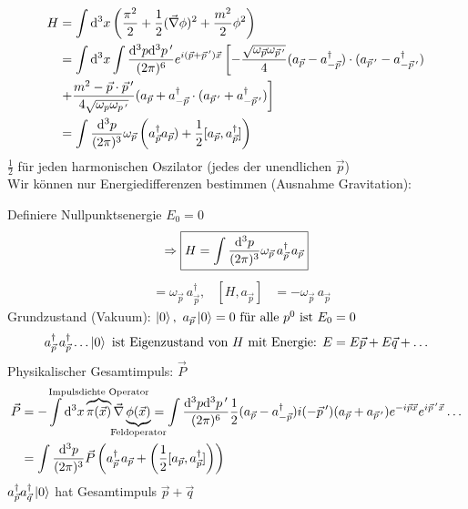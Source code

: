 	\begin{align*}
		H &= \int \mathrm{d}^3 x 
		\left(
			\frac{\pi^2}{2} + \frac{1}{2} (\vec{\nabla} \phi)^2 + \frac{m^2}{2} \phi^2
		\right) \\
		&= \int \mathrm{d}^3 x \int \frac{\mathrm{d}^3 p \mathrm{d}^3 p\,'}{(2\pi)^6} e^{i (\vec{p} + \vec{p}\,')\vec{x}} 
		\left[
			- \frac{\sqrt{\omega_{\vec{p}} \omega_{\vec{p}\,'}}}{4} 
			(a_{\vec{p}} - a_{-\vec{p}}^\dagger) \cdot (a_{\vec{p}\,'} - a_{-\vec{p}\,'}^\dagger)
		\right.\\
		&\left.
			+ \frac{m^2 - \vec{p} \cdot \vec{p}\,'}{4\sqrt{\omega_p \omega_{p\,'}}}
			(a_{\vec{p}} + a_{-\vec{p}}^\dagger \cdot (a_{\vec{p}\,'} + a_{-\vec{p}\,'}^\dagger)
		\right] \\
		&= \int \frac{\mathrm{d}^3 p}{(2 \pi)^3} \omega_{\vec{p}} 
		\left(
			a^\dagger_{\vec{p}} a_{\vec{p}}) + \frac{1}{2} [a_{\vec{p}}, a^\dagger_{\vec{p}}]
		\right)
	\end{align*}
$\frac{1}{2}$ für jeden harmonischen Oszilator (jedes der unendlichen $\vec{p}$)
\\ 
Wir können nur Energiedifferenzen bestimmen (Ausnahme Gravitation):
 
Definiere Nullpunktsenergie $E_0 = 0$
	\begin{align*}
		\Rightarrow \boxed{H = \int \frac{\mathrm{d}^3 p}{(2 \pi)^3} \omega_{\vec{p}}\, a_{\vec{p}}^\dagger \,a_{\vec{p}}}
	\end{align*}
	\begin{align*}
		[H, a_{\vec{p}}^\dagger] &= \omega_{\vec{p}}\, a_{\vec{p}}^\dagger ,&
		[H, a_{\vec{p}}] &= - \omega_{\vec{p}} \,a_{\vec{p}}
	\end{align*}
Grundzustand (Vakuum): 
$\ket{0}, ~a_{\vec{p}}\ket{0} = 0 ~\text{für alle }p^0 \text{ ist }E_0 = 0$
	\begin{align*}
		a_{\vec{p}}^\dagger \,a_{\vec{p}}^\dagger \ldots \ket{0} \text{ ist Eigenzustand von } H \text{ mit Energie: }  E= E\vec{p} + E\vec{q} + \ldots
	\end{align*}
Physikalischer Gesamtimpuls: $\vec{P}$
	\begin{align*}
		\vec{P} &= - \int \diff^3 x \overbrace{\pi (\vec{x})}^{\mathclap{\text{Impulsdichte Operator}}} \vec{\nabla} \underbrace{\phi(\vec{x})}_{\mathclap{\text{Feldoperator}}}
		= \int \frac{\diff^3 p \diff^3 p\,'}{(2\pi)^6} \frac{1}{2} (a_{\vec{p}} - a_{-\vec{p}}^\dagger) i (- \vec{p}\,') (a_{\vec{p}} + a_{\vec{p}\,'}) e^{-i\vec{p} \vec{x}} e^{i \vec{p}\,' \vec{x}} \ldots \\
		&= \int \frac{\diff^3 p}{(2\pi)^3} \vec{P} 
		\left(
			a_{\vec{p}}^\dagger \,a_{\vec{p}} + \left(\frac{1}{2} [a_{\vec{p}}, a_{\vec{p}}^\dagger] \right)
		\right)
	\end{align*}
$a_{\vec{p}}^\dagger a_{\vec{q}}^\dagger \ket{0}$ hat Gesamtimpuls $\vec{p} + \vec{q}$

